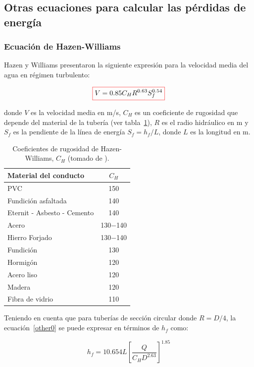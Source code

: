 \documentclass[11pt, oneside]{article}
\begin{document}
\subsection{Otras ecuaciones para calcular las p\'erdidas de energ\'ia} %
\subsubsection*{Ecuaci\'on de Hazen-Williams}
Hazen y Williams presentaron la siguiente expresi\'on para la velocidad media del agua en r\'egimen turbulento:

\begin{equation}
\color{red}\boxed{\color{black} V = 0.85 C_H R^{0.63} S_f^{0.54} }
\label{other0}
\end{equation}

donde $V$ es la velocidad media en m/s, $C_H$ es un coeficiente de rugosidad que depende del material de la tuber\'ia (ver tabla~\ref{hwi}), $R$ es el radio hidr\'aulico en m y $S_f$ es la pendiente de la l\'inea de energ\'ia $S_f = h_f / L$, donde $L$ es la longitud en m.

\begin{table}[h!]
\centering
\begin{tabular}{l c}
 \hline
 Material del conducto & $C_H$ \\ [0.5ex]
 \hline\hline
PVC & 150 \\
Fundici\'on asfaltada & 140 \\
Eternit - Asbesto - Cemento & 140 \\
Acero & 130$-$140 \\
Hierro Forjado & 130$-$140 \\
Fundici\'on & 130 \\
Hormig\'on & 120 \\
Acero liso & 120 \\
Madera & 120 \\
Fibra de vidrio & 110 \\
\hline
\end{tabular}
\caption{Coeficientes de rugosidad de Hazen-Williams, $C_H$ (tomado de \cite{agudelo2011mecanica}).}
\label{hwi}
\end{table}

Teniendo en cuenta que para tuber\'ias de secci\'on circular donde $R=D/4$, la ecuaci\'on~\ref{other0} se puede expresar en t\'erminos de $h_f$ como:

\begin{equation}
h_f = 10.654 L \left[ \frac{Q}{C_H D^{2.63}} \right]^{1.85}
\label{other1}
\end{equation}
\end{document}

